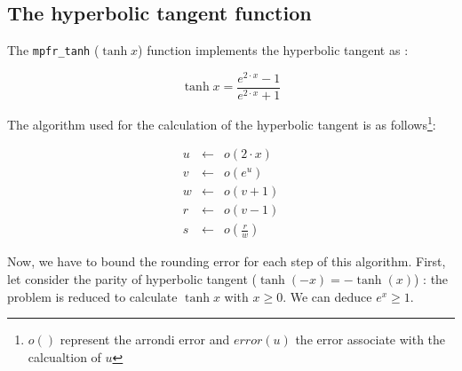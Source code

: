 \documentclass[12pt]{amsart}
\begin{document}
\subsection{The hyperbolic tangent function}

The {\tt mpfr\_tanh} ($\tanh{x}$) function implements the hyperbolic
tangent as :

$$
\tanh x = \frac{ e^{2 \cdot x} -1 }{ e^{2 \cdot x} +1} 
$$

The algorithm used for the calculation of the hyperbolic tangent is as follows\footnote{$o()$ represent the arrondi error and $error(u)$ the
  error associate with the calcualtion of $u$}:

\begin{eqnarray}\nonumber
u&\leftarrow&o(2 \cdot x)\\\nonumber
v&\leftarrow&o(e^u)\\\nonumber
w&\leftarrow&o(v+1)\\\nonumber
r&\leftarrow&o(v-1)\\\nonumber
s&\leftarrow&o(\frac{r}{w})
\end{eqnarray}

Now, we have to bound the rounding error for each step of this
algorithm.  First, let consider the parity of hyperbolic tangent
($\tanh(-x)=-\tanh(x)$) : the problem is reduced to calculate $\tanh x$ with $x \geq 0$. We can deduce $e^x \geq 1$.
\end{document}
